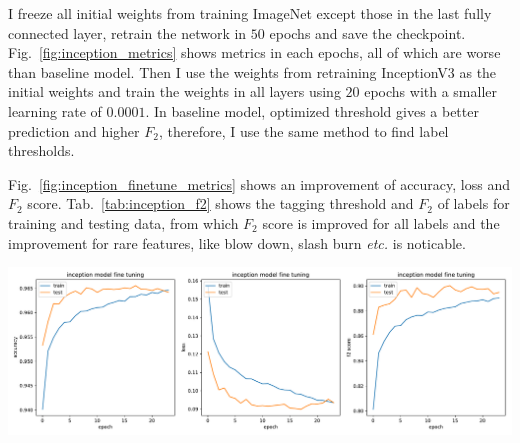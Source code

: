 \documentclass[11pt,oneside,a4paper]{article}
\newenvironment{Figure}
{\par\medskip\noindent\minipage{\linewidth}}
{\endminipage\par\medskip}
\begin{document}
I freeze all initial weights from training ImageNet except those in the last fully connected layer, retrain the network in $50$ epochs and save the checkpoint. Fig.~\ref{fig:inception_metrics} shows metrics in each epochs, all of which are worse than baseline model. Then I use the weights from retraining InceptionV3 as the initial weights and train the weights in all layers using $20$ epochs with a smaller learning rate of $0.0001$. In baseline model, optimized threshold gives a better prediction and higher $F_2$, therefore, I use the same method to find label thresholds.

Fig.~\ref{fig:inception_finetune_metrics} shows an improvement of accuracy, loss and $F_2$ score. Tab.~\ref{tab:inception_f2} shows the tagging threshold and $F_2$ of labels for training and testing data, from which $F_2$ score is improved for all labels and the improvement for rare features, like blow down, slash burn \emph{etc.} is noticable.

\begin{Figure}
 \centering
 \includegraphics[width=1.\linewidth, height=0.35\linewidth]{inception_finetune_metrics.pdf}
 \label{fig:inception_finetune_metrics}
\end{Figure}
\end{document}
